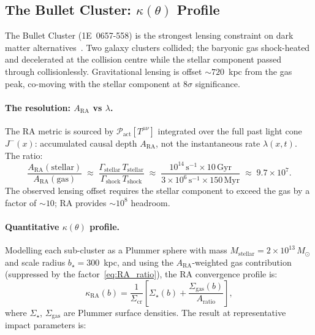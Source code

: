 \documentclass[11pt,a4paper]{article}
\theoremstyle{plain}
\theoremstyle{definition}
\theoremstyle{remark}
\newcommand{\Pact}{\mathcal{P}_{\mathrm{act}}}
\begin{document}
\subsection{The Bullet Cluster: \texorpdfstring{$\kappa(\theta)$}{kappa(theta)} Profile}
\label{sec:bullet}

The Bullet Cluster (1E~0657-558) is the strongest lensing constraint on
dark matter alternatives~\citep{Clowe2006}. Two galaxy clusters collided;
the baryonic gas shock-heated and decelerated at the collision centre while
the stellar component passed through collisionlessly. Gravitational lensing
is offset $\sim 720$~kpc from the gas peak, co-moving with the stellar
component at $8\sigma$ significance.

\paragraph{The resolution: $A_{\mathrm{RA}}$ vs $\lambda$.}
The RA metric is sourced by $\Pact[T^{\mu\nu}]$ integrated over the full
past light cone $J^-(x)$: accumulated causal depth $A_{\mathrm{RA}}$, not
the instantaneous rate $\lambda(x,t)$. The ratio:
\begin{equation}
  \frac{A_{\mathrm{RA}}(\mathrm{stellar})}{A_{\mathrm{RA}}(\mathrm{gas})}
  \;\approx\;
  \frac{\Gamma_{\mathrm{stellar}}\,T_{\mathrm{stellar}}}
       {\Gamma_{\mathrm{shock}}\,T_{\mathrm{shock}}}
  \;\approx\;
  \frac{10^{14}\,\mathrm{s}^{-1}\times 10\,\mathrm{Gyr}}
       {3\times10^6\,\mathrm{s}^{-1}\times 150\,\mathrm{Myr}}
  \;\approx\; 9.7\times10^7.
  \label{eq:RA_ratio}
\end{equation}
The observed lensing offset requires the stellar component to exceed
the gas by a factor of $\sim 10$; RA provides $\sim 10^8$ headroom.

\paragraph{Quantitative $\kappa(\theta)$ profile.}
Modelling each sub-cluster as a Plummer sphere with mass
$M_{\mathrm{stellar}} = 2\times10^{13}\,M_\odot$ and scale radius
$b_\star = 300$~kpc, and using the $A_{\mathrm{RA}}$-weighted gas
contribution (suppressed by the factor~\eqref{eq:RA_ratio}),
the RA convergence profile is:
\begin{equation}
  \kappa_{\mathrm{RA}}(b)
  = \frac{1}{\Sigma_{\mathrm{cr}}}
    \left[\Sigma_\star(b) + \frac{\Sigma_{\mathrm{gas}}(b)}{A_{\mathrm{ratio}}}\right],
\end{equation}
where $\Sigma_\star$, $\Sigma_{\mathrm{gas}}$ are Plummer surface densities.
The result at representative impact parameters is:
\end{document}
